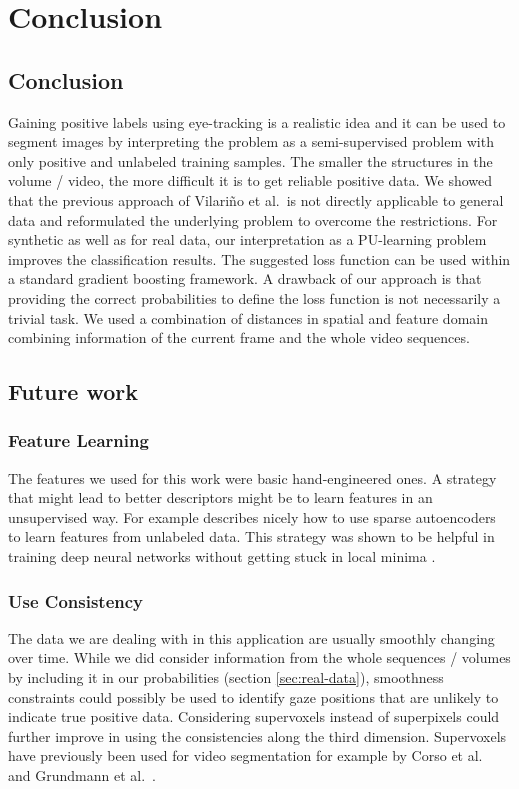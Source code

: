 \chapter{Conclusion}
\label{chap:conclusion}
\section{Conclusion}
Gaining positive labels using eye-tracking is a realistic idea and it can be used to segment images by interpreting the problem as a semi-supervised problem with only positive and unlabeled training samples. The smaller the structures in the volume / video, the more difficult it is to get reliable positive data.  We showed that the previous approach of Vilari\~no et al.\ is not directly applicable to general data and reformulated the underlying problem to overcome the restrictions. For synthetic as well as for real data, our interpretation as a PU-learning problem improves the classification results. The suggested loss function can be used within a standard gradient boosting framework. 
A drawback of our approach is that providing the correct probabilities to define the loss function is not necessarily a trivial task. We used a combination of distances in spatial and feature domain combining information of the current frame and the whole video sequences. 


\section{Future work}

\subsection{Feature Learning}
The features we used for this work were basic hand-engineered ones. 
A strategy that might lead to better descriptors might be to learn features in an unsupervised way. 
For example \cite{ng2011sparse} describes nicely how to use sparse autoencoders to learn features from unlabeled data. This strategy was shown to be helpful in training deep neural networks without getting stuck in local minima \cite{bengio2007greedy}.

\subsection{Use Consistency}
The data we are dealing with in this application are usually smoothly changing over time.
While we did consider information from the whole sequences / volumes by including it in our probabilities (section \ref{sec:real-data}), smoothness constraints could possibly be used to identify gaze positions that are unlikely to indicate true positive data. 
Considering supervoxels instead of superpixels could further improve in using the consistencies along the third dimension. Supervoxels have previously been used for video segmentation for example by Corso et al.\ \cite{CoShDuTMI2008} and Grundmann et al.\ \cite{grundmann2010efficient}.